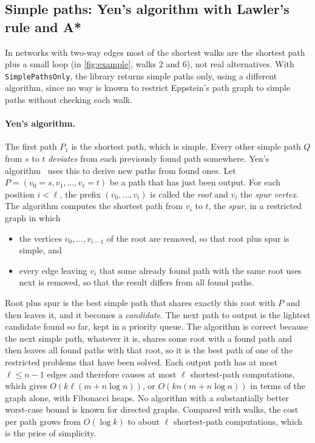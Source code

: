 \documentclass[11pt,a4paper]{article}
\begin{document}
\subsection{Simple paths: Yen's algorithm with Lawler's rule and A*}\label{sec:yen}
In networks with two-way edges most of the shortest walks are the shortest path plus a small loop (in
\cref{fig:example}, walks 2 and 6), not real alternatives. With \texttt{SimplePathsOnly}, the library returns
simple paths only, using a different algorithm, since no way is known to restrict Eppstein's path graph to simple
paths without checking each walk.

\paragraph{Yen's algorithm.} The first path $P_1$ is the shortest path, which is simple. Every other simple path
$Q$ from $s$ to $t$ \emph{deviates} from each previously found path somewhere. Yen's algorithm~\cite{yen1971} uses
this to derive new paths from found ones. Let $P=(v_0=s,v_1,\dots,v_\ell=t)$ be a path that has just been output.
For each position $i<\ell$, the prefix $(v_0,\dots,v_i)$ is called the \emph{root} and $v_i$ the \emph{spur vertex}.
The algorithm computes the shortest path from $v_i$ to $t$, the \emph{spur}, in a restricted graph in which
\begin{itemize}
  \item the vertices $v_0,\dots,v_{i-1}$ of the root are removed, so that root plus spur is simple, and
  \item every edge leaving $v_i$ that some already found path with the same root uses next is removed, so that the
        result differs from all found paths.
\end{itemize}
Root plus spur is the best simple path that shares exactly this root with $P$ and then leaves it, and it becomes
a \emph{candidate}. The next path to output is the lightest candidate found so far, kept in a priority queue.
The algorithm is correct because the next simple path, whatever it is, shares some root with a found path and
then leaves all found paths with that root, so it is the best path of one of the restricted problems that have been
solved. Each output path has at most $\ell\le n-1$ edges and therefore causes at most $\ell$ shortest-path
computations, which gives $O(k\ell(m+n\log n))$, or $O(kn(m+n\log n))$ in terms of the graph alone, with Fibonacci
heaps. No algorithm with a substantially better worst-case bound is known for directed graphs. Compared with walks, the cost per
path grows from $O(\log k)$ to about $\ell$ shortest-path computations, which is the price of simplicity.
\end{document}
